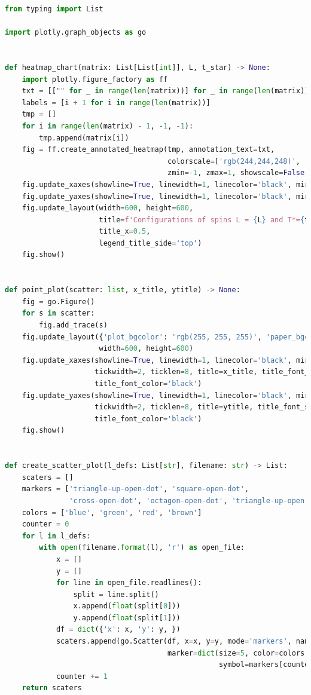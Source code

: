 \documentclass[11pt]{article}
\begin{document}
    \begin{small}
        \begin{lstlisting}[language=Python, frame=lines, numberstyle=\tiny, stepnumber=5,
            caption=Python Plots Code \label{python-plots}., firstnumber=1,label={lst:code2}]
from typing import List

import plotly.graph_objects as go


def heatmap_chart(matrix: List[List[int]], L, t_star) -> None:
    import plotly.figure_factory as ff
    txt = [["" for _ in range(len(matrix))] for _ in range(len(matrix))]
    labels = [i + 1 for i in range(len(matrix))]
    tmp = []
    for i in range(len(matrix) - 1, -1, -1):
        tmp.append(matrix[i])
    fig = ff.create_annotated_heatmap(tmp, annotation_text=txt,
                                      colorscale=['rgb(244,244,248)', 'rgb(255,0,0)'],
                                      zmin=-1, zmax=1, showscale=False, x=labels, y=labels[::-1])
    fig.update_xaxes(showline=True, linewidth=1, linecolor='black', mirror=True)
    fig.update_yaxes(showline=True, linewidth=1, linecolor='black', mirror=True)
    fig.update_layout(width=600, height=600,
                      title=f'Configurations of spins L = {L} and T*={t_star}', margin_t=65,
                      title_x=0.5,
                      legend_title_side='top')
    fig.show()


def point_plot(scatter: list, x_title, ytitle) -> None:
    fig = go.Figure()
    for s in scatter:
        fig.add_trace(s)
    fig.update_layout({'plot_bgcolor': 'rgb(255, 255, 255)', 'paper_bgcolor': 'rgb(255, 255, 255)'},
                      width=600, height=600)
    fig.update_xaxes(showline=True, linewidth=1, linecolor='black', mirror=True, ticks='outside',
                     tickwidth=2, ticklen=8, title=x_title, title_font_size=20,
                     title_font_color='black')
    fig.update_yaxes(showline=True, linewidth=1, linecolor='black', mirror=True, ticks='outside',
                     tickwidth=2, ticklen=8, title=ytitle, title_font_size=20,
                     title_font_color='black')
    fig.show()


def create_scatter_plot(l_defs: List[str], filename: str) -> List:
    scaters = []
    markers = ['triangle-up-open-dot', 'square-open-dot',
               'cross-open-dot', 'octagon-open-dot', 'triangle-up-open-dot']
    colors = ['blue', 'green', 'red', 'brown']
    counter = 0
    for l in l_defs:
        with open(filename.format(l), 'r') as open_file:
            x = []
            y = []
            for line in open_file.readlines():
                split = line.split()
                x.append(float(split[0]))
                y.append(float(split[1]))
            df = dict({'x': x, 'y': y, })
            scaters.append(go.Scatter(df, x=x, y=y, mode='markers', name=f"L={l}",
                                      marker=dict(size=5, color=colors[counter],
                                                  symbol=markers[counter])))
            counter += 1
    return scaters



\end{lstlisting}
\end{small}
\end{document}

